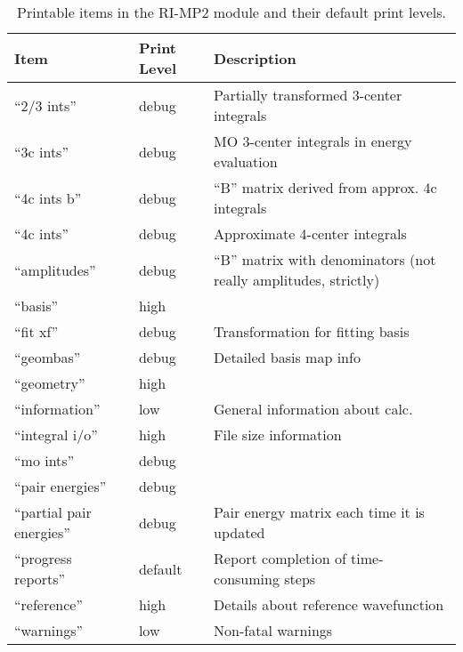 \begin{table}
\caption{Printable items in the RI-MP2 module and their default print levels.}
\label{tbl:mp2-printable}
\begin{tabular}{lll}
\hline\hline
Item                    & Print Level   & Description \\
\hline
``2/3 ints''              & debug         & Partially transformed 3-center integrals \\
``3c ints''               & debug         & MO 3-center integrals in energy evaluation \\
``4c ints b''             & debug         & ``B'' matrix derived from approx. 4c integrals \\
``4c ints''               & debug         & Approximate 4-center integrals \\
``amplitudes''            & debug         & ``B'' matrix with denominators (not really amplitudes, strictly) \\
``basis''                 & high          & \\
``fit xf''                & debug         & Transformation for fitting basis \\
``geombas''               & debug         & Detailed basis map info\\
``geometry''              & high          & \\
``information''           & low           & General information about calc.\\
``integral i/o''          & high          & File size information\\
``mo ints''               & debug         & \\
``pair energies''         & debug         & \\
``partial pair energies'' & debug         & Pair energy matrix each time it is updated \\
``progress reports''      & default       & Report completion of time-consuming steps\\
``reference''             & high          & Details about reference wavefunction\\
``warnings''              & low           & Non-fatal warnings \\
\hline\hline
\end{tabular}
\end{table}


